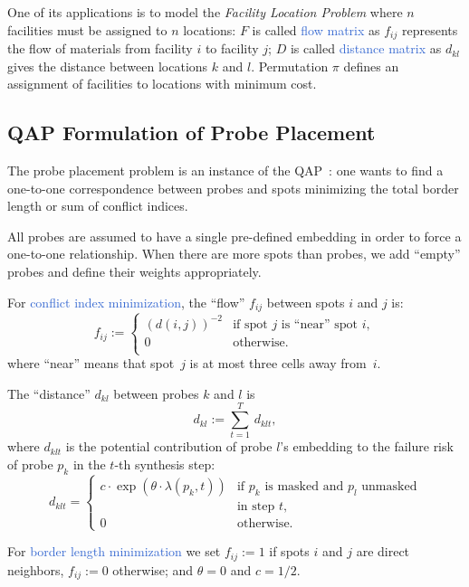 \documentclass[portrait]{a0poster}
\begin{document}
\begin{multicols}{3}[\aggiheader]
\noindent One of its applications is to model the \emph{Facility Location
Problem} where $n$ facilities must be assigned to $n$ locations: $F$ is called
\textcolor{highlight}{flow matrix} as $f_{ij}$ represents the flow of materials
from facility $i$ to facility $j$; $D$ is called
\textcolor{highlight}{distance matrix} as $d_{kl}$ gives the distance between
locations $k$ and $l$. Permutation $\pi$ defines an assignment of facilities to
locations with minimum cost.

\subsection*{QAP Formulation of Probe Placement}

\noindent The probe placement problem is an instance of the
QAP~\cite{CARVALHO06}: one wants to find a one-to-one correspondence between
probes and spots minimizing the total border length or sum of conflict indices.

\noindent All probes are assumed to have a single pre-defined embedding in order
to force a one-to-one relationship. When there are more spots than probes, we
add ``empty'' probes and define their weights appropriately.

\noindent For \textcolor{highlight}{conflict index minimization}, the ``flow''
$f_{ij}$ between spots $i$ and $j$ is:
\[
f_{ij} := \left\{ \begin{array}{ll}
      (d(i,j))^{-2} & \mbox{if spot $j$ is ``near'' spot $i$}, \\
      0 & \mbox{otherwise}. \\
    \end{array} \right.
\]
where ``near'' means that spot~$j$ is at most three cells away from~$i$.

\noindent The ``distance'' $d_{kl}$ between probes $k$ and $l$ is
\[ d_{kl} := \sum_{t=1}^T\, d_{klt}, \]
where $d_{klt}$ is the potential contribution of probe $l$'s embedding to the
failure risk of probe $p_k$ in the $t$-th synthesis step:
\[ d_{klt}  = \left\{ \begin{array}{ll}
    c \cdot \exp(\theta \cdot \lambda(p_k,t)) 
    & \mbox{if $p_k$ is masked and $p_l$ unmasked}\\
    & \mbox{in step $t$,} \\
    0
    & \mbox{otherwise.}
  \end{array} \right.
\]

\noindent For \textcolor{highlight}{border length minimization} we set
$f_{ij}:=1$ if spots $i$ and $j$ are direct neighbors, $f_{ij}:=0$ otherwise;
and $\theta=0$ and $c=1/2$.


\end{multicols}
\end{document}
